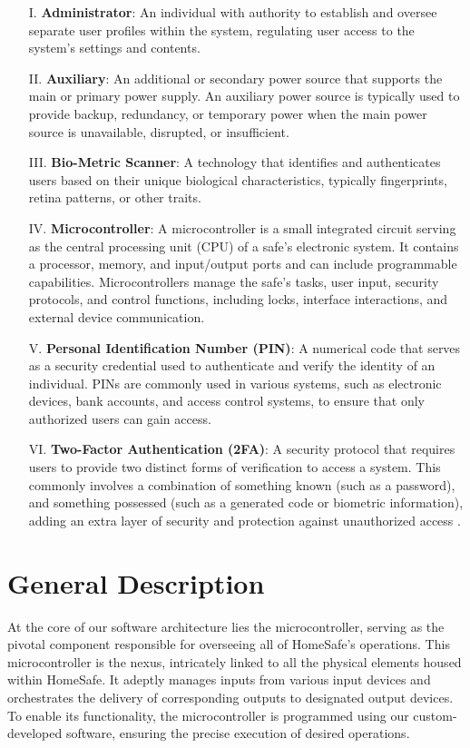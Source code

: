 \documentclass{article}
\begin{document}
\begin{enumerate}
    \item[I.] \textbf{Administrator}: An individual with authority to establish and oversee separate user profiles within the system, regulating user access to the system's settings and contents.
    \item[II.] \textbf{Auxiliary}: An additional or secondary power source that supports the main or primary power supply. An auxiliary power source is typically used to provide backup, redundancy, or temporary power when the main power source is unavailable, disrupted, or insufficient.
    \item[III.] \textbf{Bio-Metric Scanner}: A technology that identifies and authenticates users based on their unique biological characteristics, typically fingerprints, retina patterns, or other traits.
    \item[IV.] \textbf{Microcontroller}: A microcontroller is a small integrated circuit serving as the central processing unit (CPU) of a safe's electronic system. It contains a processor, memory, and input/output ports and can include programmable capabilities. Microcontrollers manage the safe's tasks, user input, security protocols, and control functions, including locks, interface interactions, and external device communication.
    \item[V.] \textbf{Personal Identification Number (PIN)}: A numerical code that serves as a security credential used to authenticate and verify the identity of an individual. PINs are commonly used in various systems, such as electronic devices, bank accounts, and access control systems, to ensure that only authorized users can gain access.
    \item[VI.] \textbf{Two-Factor Authentication (2FA)}: A security protocol that requires users to provide two distinct forms of verification to access a system. This commonly involves a combination of something known (such as a password), and something possessed (such as a generated code or biometric information), adding an extra layer of security and protection against unauthorized access \cite{identityautomationTwoFactorAuthentication}.
\end{enumerate}

\section{General Description}
At the core of our software architecture lies the microcontroller, serving as the pivotal component responsible for overseeing all of HomeSafe's operations. This microcontroller is the nexus, intricately linked to all the physical elements housed within HomeSafe. It adeptly manages inputs from various input devices and orchestrates the delivery of corresponding outputs to designated output devices. To enable its functionality, the microcontroller is programmed using our custom-developed software, ensuring the precise execution of desired operations.
\end{document}
